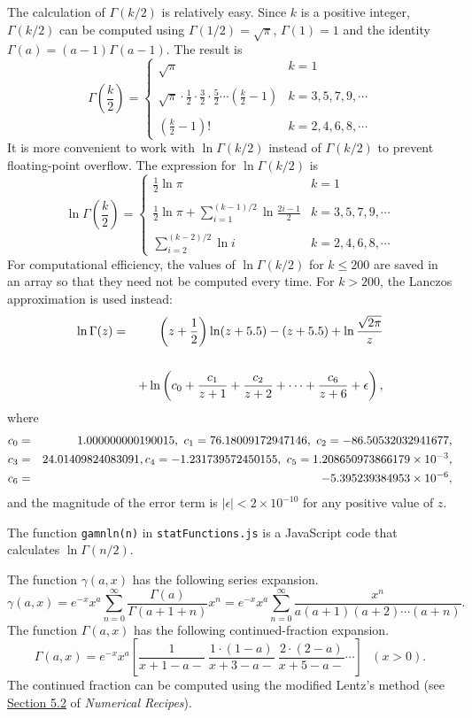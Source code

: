 \documentclass[12pt]{article}
\newcommand \beq {\begin{equation}}
\newcommand \eeq {\end{equation}}
\newcommand \beqn {\begin{eqnarray}}
\newcommand \eeqn {\end{eqnarray}}
\begin{document}
The calculation of $\Gamma(k/2)$ is relatively easy. Since $k$ is a 
positive integer, $\Gamma(k/2)$ can be computed using $\Gamma(1/2)=\sqrt{\pi}$, 
$\Gamma(1)=1$ and the identity $\Gamma(a)=(a-1)\Gamma(a-1)$. The result is 
\beq
  \Gamma\left(\frac{k}{2}\right) = \left \{ \begin{array}{ll} 
\sqrt{\pi} & k=1 \\ \\ \sqrt{\pi}\cdot \frac{1}{2}\cdot \frac{3}{2}\cdot \frac{5}{2}\cdots 
\left(\frac{k}{2}-1\right) & k=3,5,7,9,\cdots \\ \\ 
\left(\frac{k}{2}-1\right)! & k=2,4,6,8,\cdots \end{array} \right. 
\eeq
It is more convenient to work with $\ln \Gamma(k/2)$ instead of $\Gamma(k/2)$ to prevent 
floating-point overflow. The expression for $\ln \Gamma(k/2)$ is 
\beq
  \ln \Gamma\left(\frac{k}{2}\right) = \left \{ \begin{array}{ll} 
\frac{1}{2}\ln \pi & k=1 \\ \\
\frac{1}{2}\ln \pi + \sum\limits_{i=1}^{(k-1)/2} \ln \frac{2i-1}{2} & k=3,5,7,9,\cdots \\ \\ 
\sum\limits_{i=2}^{(k-2)/2} \ln i & k=2,4,6,8,\cdots \end{array} \right.
\eeq
For computational efficiency, the values of $\ln \Gamma(k/2)$ for $k \leq 200$ are 
saved in an array so that they need not be computed every time. For $k > 200$, 
the Lanczos approximation is used instead:
\beqn
  \ln \Gamma(z) &=& \left( z + \frac{1}{2}\right) \ln (z+ 5.5) 
- (z+5.5) + \ln \frac{\sqrt{2\pi}}{z} \cr\cr  
&& + \ln \left( c_0 + \frac{c_1}{z+1}+\frac{c_2}{z+2}+\cdots + \frac{c_6}{z+6} 
+ \epsilon\right) ,
\label{eq:lnGamma}
\eeqn
where 
\beqn
  c_0 &=& 1.000000000190015, \ c_1 = 76.18009172947146, \ c_2 = -86.50532032941677, \cr
  c_3 &=& 24.01409824083091,  
  c_4 = -1.231739572450155, \ c_5 = 1.208650973866179\times 10^{-3}, \cr
  c_6 &=& -5.395239384953\times 10^{-6} ,
\eeqn
and the magnitude of the error term is $|\epsilon|<2\times 10^{-10}$ for 
any positive value of $z$. 

The function {\tt gamnln(n)} in {\tt statFunctions.js} is a JavaScript code that 
calculates $\ln \Gamma(n/2)$.

The function $\gamma(a,x)$ has the following series expansion. 
\beq
  \gamma(a,x) = e^{-x} x^a \sum_{n=0}^{\infty} \frac{\Gamma(a)}{\Gamma(a+1+n)}x^n 
= e^{-x} x^a \sum_{n=0}^{\infty} \frac{x^n}{a(a+1)(a+2)\cdots (a+n)} .
\label{eq:gser}
\eeq
The function $\Gamma(a,x)$ has the following continued-fraction expansion. 
\beq
  \Gamma(a,x)=e^{-x} x^a \left[ \frac{1}{x+1-a-}\  \frac{1\cdot (1-a)}{x+3-a-}\  
\frac{2\cdot (2-a)}{x+5-a-} \cdots\right] \ \ \ (x>0) .
\label{eq:gcf}
\eeq
The continued fraction can be computed using the modified Lentz's method (see 
\href{http://www.aip.de/groups/soe/local/numres/bookfpdf/f5-2.pdf}{Section 5.2} 
of {\it Numerical Recipes}).
\end{document}
